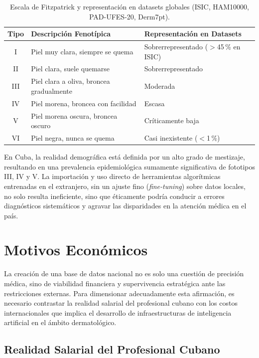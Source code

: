 \begin{table}[htbp]
\centering
\caption{Escala de Fitzpatrick y representación en datasets globales (ISIC, HAM10000, PAD-UFES-20, Derm7pt).}\label{tab:fitzpatrick}
\begin{tabular}{clp{5.5cm}}
\toprule
\textbf{Tipo} & \textbf{Descripción Fenotípica} & \textbf{Representación en Datasets} \\
\midrule
I & Piel muy clara, siempre se quema & Sobrerrepresentado ($>$45\,\% en ISIC)~\cite{iccs_bias_derm} \\
II & Piel clara, suele quemarse & Sobrerrepresentado~\cite{iccs_bias_derm} \\
III & Piel clara a oliva, broncea gradualmente & Moderada~\cite{arxiv_skin_tone} \\
IV & Piel morena, broncea con facilidad & Escasa~\cite{arxiv_skin_tone} \\
V & Piel morena oscura, broncea oscuro & Críticamente baja ~\cite{arxiv_skin_tone} \\
VI & Piel negra, nunca se quema & Casi inexistente ($<$1\,\%)~\cite{iccs_bias_derm} \\
\bottomrule
\end{tabular}
\end{table}

En Cuba, la realidad demográfica está definida por un alto grado de mestizaje, resultando en una 
prevalencia epidemiológica sumamente significativa de fototipos III, IV y V. La importación y uso 
directo de herramientas algorítmicas entrenadas en el extranjero, sin un ajuste 
fino (\textit{fine-tuning}) sobre datos locales, no solo resulta ineficiente, sino que éticamente 
podría conducir a errores diagnósticos sistemáticos y agravar las disparidades en la atención 
médica en el país.


\section{Motivos Económicos}\label{sec:motivos-economicos}

La creación de una base de datos nacional no es solo una cuestión de precisión médica, sino de viabilidad 
financiera y supervivencia estratégica ante las restricciones externas. Para dimensionar adecuadamente 
esta afirmación, es necesario contrastar la realidad salarial del profesional cubano con los costos 
internacionales que implica el desarrollo de infraestructuras de inteligencia artificial en el 
ámbito dermatológico.


\subsection{Realidad Salarial del Profesional Cubano}\label{sec:salario-cubano}

